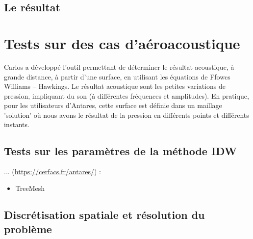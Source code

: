 \subsection{Le résultat}





\section{Tests sur des cas d'aéroacoustique}


Carlos a développé l'outil permettant de déterminer le résultat acoustique, à grande distance, à partir d'une surface, en utilisant les équations de Ffowcs Williams – Hawkings. Le résultat acoustique sont les petites variations de pression, impliquant du son (à différentes fréquences et amplitudes). En pratique, pour les utilisateurs d'Antares, cette surface est définie dans un maillage 'solution' où nous avons le résultat de la pression en différents points et différents instants.
\subsection{Tests sur les paramètres de la méthode IDW}




... (\url{https://cerfacs.fr/antares/}) : 


\begin{itemize}
    \item TreeMesh 
\end{itemize}


\subsection{Discrétisation spatiale et résolution du problème}